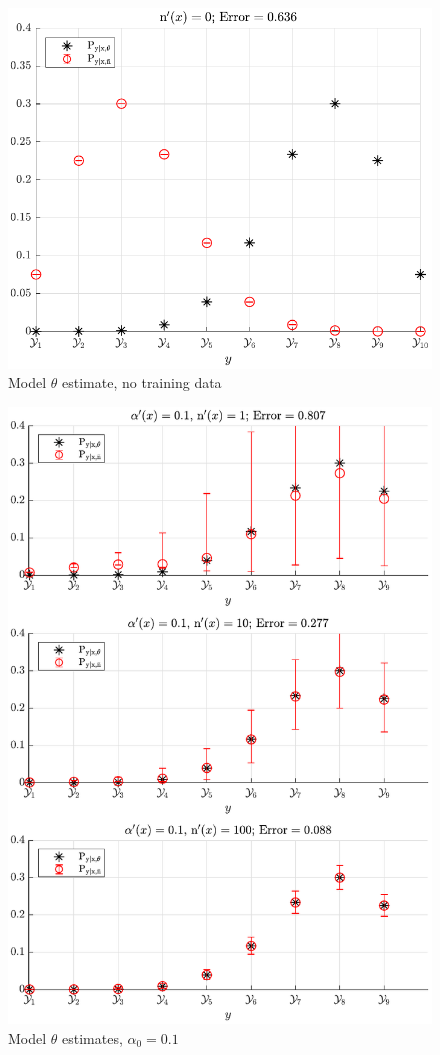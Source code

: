 \documentclass[12pt]{article}
\begin{document}
\begin{figure}
\centering
\includegraphics[scale=1.0]{P_yx_error_N_0.pdf}
\caption{Model $\theta$ estimate, no training data}
\label{fig:P_yx_error_N_0}
\end{figure}

\begin{figure}
\centering
\includegraphics[scale=0.8]{P_yx_error_a0_0_1.pdf}
\caption{Model $\theta$ estimates, $\alpha_0 = 0.1$}
\label{fig:P_yx_error_a0_0_1}
\end{figure}
\end{document}
